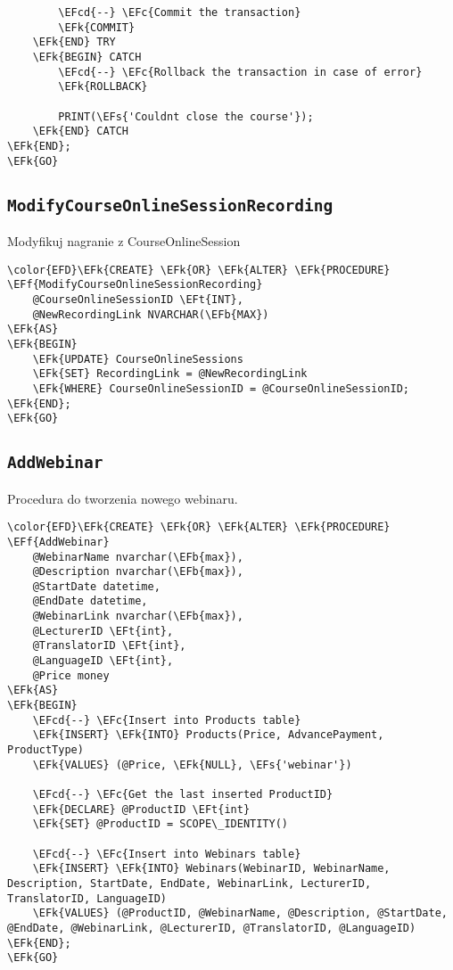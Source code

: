 \documentclass[11pt]{article}
\newcommand{\EFc}[1]{\textcolor{EFc}{\textit{#1}}} %
\newcommand{\EFcd}[1]{\textcolor{EFcd}{\textit{#1}}} %
\newcommand{\EFs}[1]{\textcolor{EFs}{#1}} %
\newcommand{\EFk}[1]{\textcolor{EFk}{\textbf{#1}}} %
\newcommand{\EFb}[1]{\textcolor{EFb}{\textbf{#1}}} %
\newcommand{\EFf}[1]{\textcolor{EFf}{#1}} %
\newcommand{\EFt}[1]{\textcolor{EFt}{\textbf{#1}}} %
\begin{document}
\begin{Code}
\begin{Verbatim}
        \EFcd{--} \EFc{Commit the transaction}
        \EFk{COMMIT}
    \EFk{END} TRY
    \EFk{BEGIN} CATCH
        \EFcd{--} \EFc{Rollback the transaction in case of error}
        \EFk{ROLLBACK}

        PRINT(\EFs{'Couldnt close the course'});
    \EFk{END} CATCH
\EFk{END};
\EFk{GO}
\end{Verbatim}
\end{Code}
\subsection{\texttt{ModifyCourseOnlineSessionRecording}}
\label{sec:orgc9d8215}
Modyfikuj nagranie z CourseOnlineSession
\begin{Code}
\begin{Verbatim}
\color{EFD}\EFk{CREATE} \EFk{OR} \EFk{ALTER} \EFk{PROCEDURE} \EFf{ModifyCourseOnlineSessionRecording}
    @CourseOnlineSessionID \EFt{INT},
    @NewRecordingLink NVARCHAR(\EFb{MAX})
\EFk{AS}
\EFk{BEGIN}
    \EFk{UPDATE} CourseOnlineSessions
    \EFk{SET} RecordingLink = @NewRecordingLink
    \EFk{WHERE} CourseOnlineSessionID = @CourseOnlineSessionID;
\EFk{END};
\EFk{GO}
\end{Verbatim}
\end{Code}
\subsection{\texttt{AddWebinar}}
\label{sec:org9485e41}
Procedura do tworzenia nowego webinaru.
\begin{Code}
\begin{Verbatim}
\color{EFD}\EFk{CREATE} \EFk{OR} \EFk{ALTER} \EFk{PROCEDURE} \EFf{AddWebinar}
    @WebinarName nvarchar(\EFb{max}),
    @Description nvarchar(\EFb{max}),
    @StartDate datetime,
    @EndDate datetime,
    @WebinarLink nvarchar(\EFb{max}),
    @LecturerID \EFt{int},
    @TranslatorID \EFt{int},
    @LanguageID \EFt{int},
    @Price money
\EFk{AS}
\EFk{BEGIN}
    \EFcd{--} \EFc{Insert into Products table}
    \EFk{INSERT} \EFk{INTO} Products(Price, AdvancePayment, ProductType)
    \EFk{VALUES} (@Price, \EFk{NULL}, \EFs{'webinar'})

    \EFcd{--} \EFc{Get the last inserted ProductID}
    \EFk{DECLARE} @ProductID \EFt{int}
    \EFk{SET} @ProductID = SCOPE\_IDENTITY()

    \EFcd{--} \EFc{Insert into Webinars table}
    \EFk{INSERT} \EFk{INTO} Webinars(WebinarID, WebinarName, Description, StartDate, EndDate, WebinarLink, LecturerID, TranslatorID, LanguageID)
    \EFk{VALUES} (@ProductID, @WebinarName, @Description, @StartDate, @EndDate, @WebinarLink, @LecturerID, @TranslatorID, @LanguageID)
\EFk{END};
\EFk{GO}
\end{Verbatim}
\end{Code}
\end{document}
